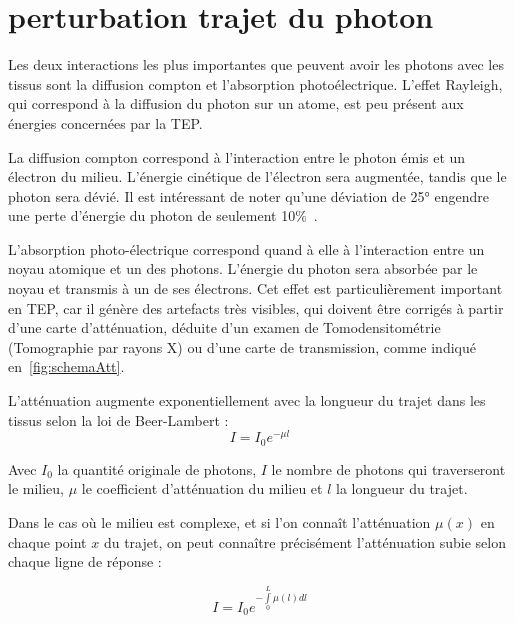 	\section{perturbation trajet du photon}

Les deux interactions les plus importantes que peuvent avoir les photons avec les tissus sont la diffusion compton et l'absorption photoélectrique. L'effet Rayleigh, qui correspond à la diffusion du photon sur un atome, est peu présent aux énergies concernées par la TEP. 

La diffusion compton correspond à l'interaction entre le photon émis et un électron du milieu. L'énergie cinétique de l'électron sera augmentée, tandis que le photon sera dévié. Il est intéressant de noter qu'une déviation de 25° engendre une perte d'énergie du photon de seulement 10\%~\cite{evans1955atomic}.

L'absorption photo-électrique correspond quand à elle à l'interaction entre un noyau atomique et un des photons. L'énergie du photon sera absorbée par le noyau et transmis à un de ses électrons. Cet effet est particulièrement important en TEP, car il génère des artefacts très visibles, qui doivent être corrigés à partir d'une carte d'atténuation, déduite d'un examen de Tomodensitométrie (Tomographie par rayons X) ou d'une carte de transmission, comme indiqué en~\ref{fig:schemaAtt}.

L'atténuation augmente exponentiellement avec la longueur du trajet dans les tissus selon la loi de Beer-Lambert :
\begin{equation}
I = I_0 e^{-\mu l}
\end{equation}

Avec $I_0$ la quantité originale de photons, $I$ le nombre de photons qui traverseront le milieu, $\mu$ le coefficient d'atténuation du milieu et $l$ la longueur du trajet. 

Dans le cas où le milieu est complexe, et si l'on connaît l'atténuation $\mu(x)$ en chaque point $x$ du trajet, on peut connaître précisément l'atténuation subie selon chaque ligne de réponse :

\begin{equation}
I = I_0 e^{- \int\limits^L_0 \mu(l) dl}
\end{equation}


